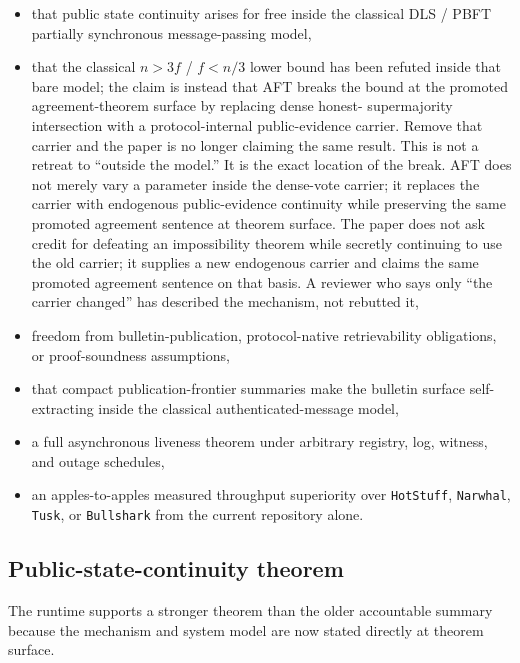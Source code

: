 \documentclass[11pt]{article}
\newcommand{\AFT}{\textsc{AFT}}
\newcommand{\code}[1]{\texttt{#1}}
\begin{document}
\begin{itemize}[leftmargin=1.5em]
\item that public state continuity arises for free inside the classical DLS /
PBFT partially synchronous message-passing model,
\item that the classical \(n > 3f\) / \(f < n/3\) lower bound has been
refuted inside that bare model; the claim is instead that \AFT{} breaks the
bound at the promoted agreement-theorem surface by replacing dense honest-
supermajority intersection with a protocol-internal public-evidence carrier.
Remove that carrier and the paper is no longer claiming the same result. This
is not a retreat to ``outside the model.'' It is the exact location of the
break. \AFT{} does not merely vary a parameter inside the dense-vote carrier;
it replaces the carrier with endogenous public-evidence continuity while
preserving the same promoted agreement sentence at theorem surface. The paper
does not ask credit for defeating an impossibility theorem while secretly
continuing to use the old carrier; it supplies a new endogenous carrier and
claims the same promoted agreement sentence on that basis. A reviewer who says
only ``the carrier changed'' has described the mechanism, not rebutted it,
\item freedom from bulletin-publication, protocol-native retrievability
obligations, or proof-soundness assumptions,
\item that compact publication-frontier summaries make the bulletin surface
self-extracting inside the classical authenticated-message model,
\item a full asynchronous liveness theorem under arbitrary registry, log,
witness, and outage schedules,
\item an apples-to-apples measured throughput superiority over
\code{HotStuff}, \code{Narwhal}, \code{Tusk}, or \code{Bullshark} from the
current repository alone.
\end{itemize}

\subsection{Public-state-continuity theorem}
\label{sec:accountable-ba}

The runtime supports a stronger theorem than the older accountable summary
because the mechanism and system model are now stated directly at theorem
surface.
\end{document}
